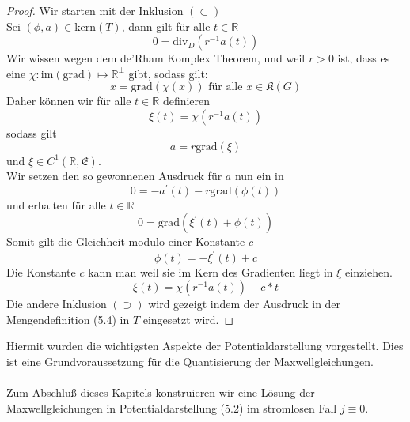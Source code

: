 \documentclass[11pt,a4paper,leqno]{report}
\numberwithin{equation}{chapter}
\begin{document}
\begin{proof}
Wir starten mit der Inklusion $(\subset)$\\
Sei $(\phi, a)\in \text{kern}(T)$, dann gilt f\"ur alle $t\in\mathbb{R}$
\begin{equation*}
	0 = \text{div}_D(r^{-1}a(t))
\end{equation*} 
Wir wissen wegen dem de'Rham Komplex Theorem, und weil $r>0$ ist, dass es eine  $\chi:\text{im}(\text{grad})\mapsto \mathbb{R}^\perp$ gibt, sodass gilt:
\begin{equation*}
	x = \text{grad}(\chi(x)) \text{ f\"ur  alle }x\in\mathfrak{K}(G)
\end{equation*}
Daher k\"onnen wir f\"ur alle $t\in\mathbb{R}$ definieren 
\begin{equation*}
\xi(t) = \chi(r^{-1}a(t))
\end{equation*} sodass gilt
\begin{equation*}
	a=r\text{grad}(\xi)
\end{equation*} und $\xi\in C^1(\mathbb{R},\mathfrak{E})$.\\
Wir setzen den so gewonnenen Ausdruck f\"ur $a$ nun ein in
\begin{equation*}
	0=-a^\prime(t) - r\text{grad}(\phi(t))
\end{equation*} 
und erhalten f\"ur alle $t\in\mathbb{R}$
\begin{equation*}
0=\text{grad}(\xi^\prime(t)+\phi(t))
\end{equation*} 
Somit gilt die Gleichheit modulo einer Konstante $c$
\begin{equation*}
\phi(t)=-\xi^\prime(t) +c
\end{equation*}
Die Konstante $c$ kann man weil sie im Kern des Gradienten liegt in $\xi$ einziehen.
\begin{equation*}
	\xi(t) = \chi(r^{-1}a(t)) -c*t
\end{equation*}
\noindent
Die andere Inklusion $(\supset)$ wird gezeigt indem der Ausdruck in der Mengendefinition (5.4) in $T$ eingesetzt wird.
\end{proof}
\noindent
Hiermit wurden die wichtigsten Aspekte der Potentialdarstellung vorgestellt. Dies ist eine Grundvoraussetzung f\"ur die Quantisierung der Maxwellgleichungen.\\
\\
Zum Abschlu\ss{} dieses Kapitels konstruieren wir eine L\"osung der Maxwellgleichungen in Potentialdarstellung (5.2) im stromlosen Fall $j\equiv 0$.\\
\\
\end{document}
